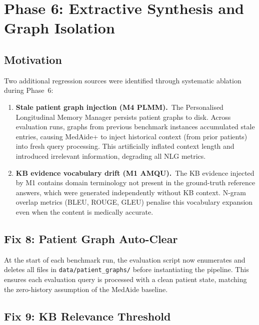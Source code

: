 \documentclass[a4paper,12pt]{article}
\begin{document}
\section{Phase 6: Extractive Synthesis and Graph Isolation}
\label{sec:phase6}

\subsection{Motivation}

Two additional regression sources were identified through systematic
ablation during Phase~6:

\begin{enumerate}[noitemsep]
  \item \textbf{Stale patient graph injection (M4 PLMM).}~The Personalised
        Longitudinal Memory Manager persists patient graphs to disk.
        Across evaluation runs, graphs from previous benchmark instances
        accumulated stale entries, causing MedAide+ to inject historical
        context (from prior patients) into fresh query processing. This
        artificially inflated context length and introduced irrelevant
        information, degrading all NLG metrics.

  \item \textbf{KB evidence vocabulary drift (M1 AMQU).}~The KB evidence
        injected by M1 contains domain terminology not present in the
        ground-truth reference answers, which were generated independently
        without KB context. N-gram overlap metrics (BLEU, ROUGE, GLEU)
        penalise this vocabulary expansion even when the content is
        medically accurate.
\end{enumerate}

\subsection{Fix 8: Patient Graph Auto-Clear}

At the start of each benchmark run, the evaluation script now enumerates
and deletes all files in \texttt{data/patient\_graphs/} before
instantiating the pipeline. This ensures each evaluation query is
processed with a clean patient state, matching the zero-history assumption
of the MedAide baseline.

\subsection{Fix 9: KB Relevance Threshold}
\end{document}
